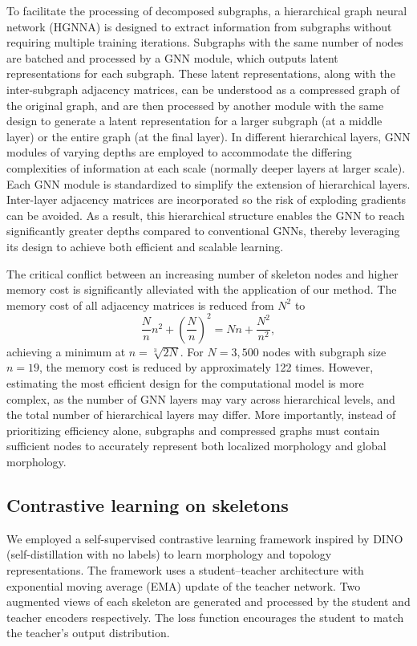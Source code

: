 \documentclass[10pt]{article}
\begin{document}
To facilitate the processing of decomposed subgraphs, a hierarchical graph neural network (HGNNA) is designed to extract information from subgraphs without requiring multiple training iterations. Subgraphs with the same number of nodes are batched and processed by a GNN module, which outputs latent representations for each subgraph. These latent representations, along with the inter-subgraph adjacency matrices, can be understood as a compressed graph of the original graph, and are then processed by another module with the same design to generate a latent representation for a larger subgraph (at a middle layer) or the entire graph (at the final layer). In different hierarchical layers, GNN modules of varying depths are employed to accommodate the differing complexities of information at each scale (normally deeper layers at larger scale). Each GNN module is standardized to simplify the extension of hierarchical layers. Inter-layer adjacency matrices are incorporated so the risk of exploding gradients can be avoided. As a result, this hierarchical structure enables the GNN to reach significantly greater depths compared to conventional GNNs, thereby leveraging its design to achieve both efficient and scalable learning.

The critical conflict between an increasing number of skeleton nodes and higher memory cost is significantly alleviated with the application of our method. The memory cost of all adjacency matrices is reduced from $N^2$ to
\begin{equation}
\frac{N}{n} n^{2} + \left(\frac{N}{n}\right)^{2} = Nn + \frac{N^{2}}{n^{2}},
\end{equation}
achieving a minimum at $n = \sqrt[3]{2N}$. For $N = 3{,}500$ nodes with subgraph size $n = 19$, the memory cost is reduced by approximately 122 times. However, estimating the most efficient design for the computational model is more complex, as the number of GNN layers may vary across hierarchical levels, and the total number of hierarchical layers may differ. More importantly, instead of prioritizing efficiency alone, subgraphs and compressed graphs must contain sufficient nodes to accurately represent both localized morphology and global morphology.

\subsection*{Contrastive learning on skeletons}
We employed a self-supervised contrastive learning framework inspired by DINO (self-distillation with no labels) to learn morphology and topology representations. The framework uses a student--teacher architecture with exponential moving average (EMA) update of the teacher network. Two augmented views of each skeleton are generated and processed by the student and teacher encoders respectively. The loss function encourages the student to match the teacher's output distribution.
\end{document}
